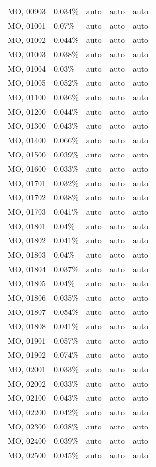 \begin{longtable}[]{@{}lllll@{}}
MO, 00903 & 0.034\% & auto & auto & auto \\
MO, 01001 & 0.07\% & auto & auto & auto \\
MO, 01002 & 0.044\% & auto & auto & auto \\
MO, 01003 & 0.038\% & auto & auto & auto \\
MO, 01004 & 0.03\% & auto & auto & auto \\
MO, 01005 & 0.052\% & auto & auto & auto \\
MO, 01100 & 0.036\% & auto & auto & auto \\
MO, 01200 & 0.044\% & auto & auto & auto \\
MO, 01300 & 0.043\% & auto & auto & auto \\
MO, 01400 & 0.066\% & auto & auto & auto \\
MO, 01500 & 0.039\% & auto & auto & auto \\
MO, 01600 & 0.033\% & auto & auto & auto \\
MO, 01701 & 0.032\% & auto & auto & auto \\
MO, 01702 & 0.038\% & auto & auto & auto \\
MO, 01703 & 0.041\% & auto & auto & auto \\
MO, 01801 & 0.04\% & auto & auto & auto \\
MO, 01802 & 0.041\% & auto & auto & auto \\
MO, 01803 & 0.04\% & auto & auto & auto \\
MO, 01804 & 0.037\% & auto & auto & auto \\
MO, 01805 & 0.04\% & auto & auto & auto \\
MO, 01806 & 0.035\% & auto & auto & auto \\
MO, 01807 & 0.054\% & auto & auto & auto \\
MO, 01808 & 0.041\% & auto & auto & auto \\
MO, 01901 & 0.057\% & auto & auto & auto \\
MO, 01902 & 0.074\% & auto & auto & auto \\
MO, 02001 & 0.033\% & auto & auto & auto \\
MO, 02002 & 0.033\% & auto & auto & auto \\
MO, 02100 & 0.043\% & auto & auto & auto \\
MO, 02200 & 0.042\% & auto & auto & auto \\
MO, 02300 & 0.038\% & auto & auto & auto \\
MO, 02400 & 0.039\% & auto & auto & auto \\
MO, 02500 & 0.045\% & auto & auto & auto \\

\end{longtable}
